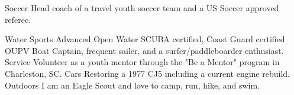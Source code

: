



\begin{cvskills}
  \cvskill
    {Soccer} %
    {Head coach of a travel youth soccer team and a US Soccer approved referee.} %

  \cvskill
    {Water Sports} %
    {Advanced Open Water SCUBA certified, Coast Guard certified OUPV Boat Captain, frequent sailer, and a surfer/paddleboarder enthusiast.} %
  \cvskill
    {Service} %
    {Volunteer as a youth mentor through the "Be a Mentor" program in Charleston, SC.} %
  \cvskill
    {Cars} %
    {Restoring a 1977 CJ5 including a current engine rebuild.} %
  \cvskill
    {Outdoors} %
    {I am an Eagle Scout and love to camp, run, hike, and swim.} %

\end{cvskills}